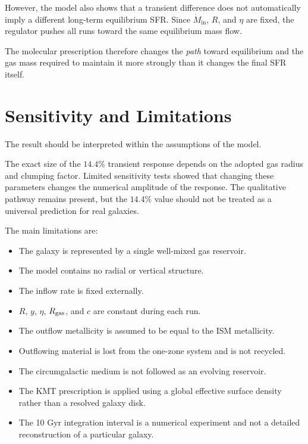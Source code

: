 \documentclass[10pt,a4paper]{article}
\newcommand{\Mgin}{\dot{M}_{\mathrm{in}}}
\begin{document}
However, the model also shows that a transient difference does not automatically imply a different long-term equilibrium SFR. Since \(\Mgin\), \(R\), and \(\eta\) are fixed, the regulator pushes all runs toward the same equilibrium mass flow.

The molecular prescription therefore changes the \emph{path} toward equilibrium and the gas mass required to maintain it more strongly than it changes the final SFR itself.

\section{Sensitivity and Limitations}

The result should be interpreted within the assumptions of the model.

The exact size of the \(14.4\%\) transient response depends on the adopted gas radius and clumping factor. Limited sensitivity tests showed that changing these parameters changes the numerical amplitude of the response. The qualitative pathway remains present, but the \(14.4\%\) value should not be treated as a universal prediction for real galaxies.

The main limitations are:

\begin{itemize}[leftmargin=*]

\item The galaxy is represented by a single well-mixed gas reservoir.

\item The model contains no radial or vertical structure.

\item The inflow rate is fixed externally.

\item \(R\), \(y\), \(\eta\), \(R_{\rm gas}\), and \(c\) are constant during each run.

\item The outflow metallicity is assumed to be equal to the ISM metallicity.

\item Outflowing material is lost from the one-zone system and is not recycled.

\item The circumgalactic medium is not followed as an evolving reservoir.

\item The KMT prescription is applied using a global effective surface density rather than a resolved galaxy disk.

\item The 10 Gyr integration interval is a numerical experiment and not a detailed reconstruction of a particular galaxy.

\end{itemize}
\end{document}
